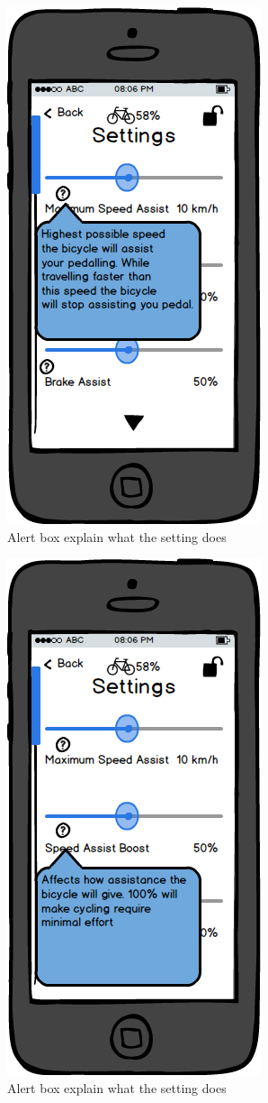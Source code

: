 \documentclass[a4paper]{report}
\begin{document}
\clearpage
\begin{figure}
\centering
\includegraphics[scale=0.9]{figures/prototype_2/settings_help_1}
\caption{Alert box explain what the setting does}
\end{figure}
\clearpage
\begin{figure}
\centering
\includegraphics[scale=0.9]{figures/prototype_2/settings_help_2}
\caption{Alert box explain what the setting does}
\end{figure}
\end{document}
